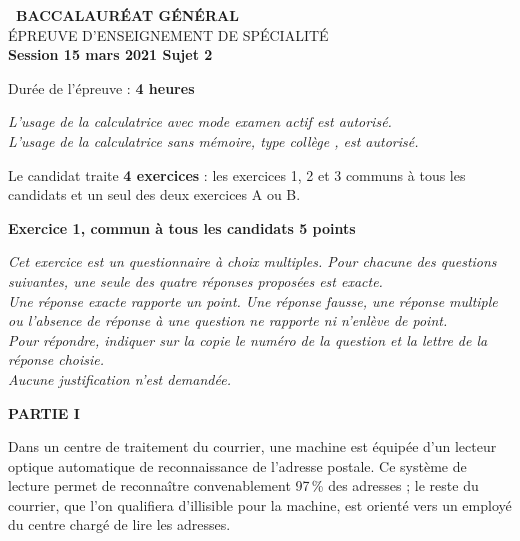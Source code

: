 \documentclass[10pt,a4paper,french]{article}
\begin{document}
\setlength\parindent{0mm}

\pagestyle{fancy}
\thispagestyle{empty}
\begin{center}{\textbf{\Large\decofourleft~BACCALAURÉAT GÉNÉRAL}~\decofourright\\[6pt]
{\large ÉPREUVE D'ENSEIGNEMENT DE SPÉCIALITÉ}\\[6pt]
\textbf{Session 15 mars 2021 Sujet 2}}

\vspace{1cm}

Durée de l’épreuve : \textbf{4 heures}

\vspace{0,5cm}

\emph{L’usage de la calculatrice avec mode examen actif est autorisé.\\
L’usage de la calculatrice sans mémoire, \og type collège \fg, est autorisé.}

\end{center}

\vspace{0,25cm}

Le candidat traite \textbf{4 exercices} : les exercices 1, 2 et 3 communs à tous les candidats et un seul des deux exercices A ou B.

\bigskip

\textbf{Exercice 1, commun à tous les candidats \hfill 5 points}

\medskip

\emph{Cet exercice est un questionnaire à choix multiples. Pour chacune des questions suivantes, une seule des quatre réponses proposées est exacte.\\ Une réponse exacte rapporte un point. Une réponse fausse, une réponse multiple ou l'absence de réponse à une question ne rapporte ni n'enlève de point.\\ Pour répondre, indiquer sur la copie le numéro de la question et la lettre de la réponse choisie.\\ Aucune justification n'est demandée.}

\bigskip

\textbf{PARTIE I}

\medskip

Dans un centre de traitement du courrier, une machine est équipée d'un lecteur optique automatique de reconnaissance de l'adresse postale. Ce système de lecture permet de reconnaître convenablement 97\,\% des adresses ; le reste du courrier, que l'on qualifiera d'illisible pour la machine, est orienté vers un employé du centre chargé de lire les adresses.
\end{document}
